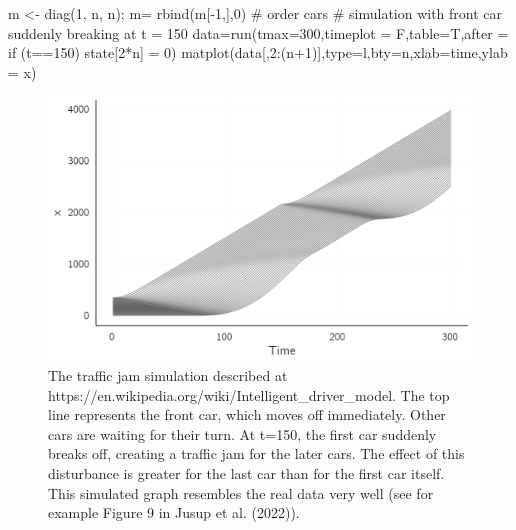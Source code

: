 \documentclass[
  a4paper,
  DIV=11,
  numbers=noendperiod]{scrreprt}
\newenvironment{Shaded}{\begin{snugshade}}{\end{snugshade}}
\newcommand{\AttributeTok}[1]{\textcolor[rgb]{0.40,0.45,0.13}{#1}}
\newcommand{\CommentTok}[1]{\textcolor[rgb]{0.37,0.37,0.37}{#1}}
\newcommand{\DecValTok}[1]{\textcolor[rgb]{0.68,0.00,0.00}{#1}}
\newcommand{\FunctionTok}[1]{\textcolor[rgb]{0.28,0.35,0.67}{#1}}
\newcommand{\NormalTok}[1]{\textcolor[rgb]{0.00,0.23,0.31}{#1}}
\newcommand{\OtherTok}[1]{\textcolor[rgb]{0.00,0.23,0.31}{#1}}
\newcommand{\SpecialCharTok}[1]{\textcolor[rgb]{0.37,0.37,0.37}{#1}}
\newcommand{\StringTok}[1]{\textcolor[rgb]{0.13,0.47,0.30}{#1}}
\begin{document}
\begin{Shaded}
\begin{Highlighting}[]
\NormalTok{m }\OtherTok{\textless{}{-}} \FunctionTok{diag}\NormalTok{(}\DecValTok{1}\NormalTok{, n, n); m}\OtherTok{=} \FunctionTok{rbind}\NormalTok{(m[}\SpecialCharTok{{-}}\DecValTok{1}\NormalTok{,],}\DecValTok{0}\NormalTok{) }\CommentTok{\# order cars}
\CommentTok{\# simulation with front car suddenly breaking at t = 150}
\NormalTok{data}\OtherTok{=}\FunctionTok{run}\NormalTok{(}\AttributeTok{tmax=}\DecValTok{300}\NormalTok{,}\AttributeTok{timeplot =}\NormalTok{ F,}\AttributeTok{table=}\NormalTok{T,}\AttributeTok{after =} \StringTok{\textquotesingle{}if (t==150) state[2*n] = 0\textquotesingle{}}\NormalTok{)}
\FunctionTok{matplot}\NormalTok{(data[,}\DecValTok{2}\SpecialCharTok{:}\NormalTok{(n}\SpecialCharTok{+}\DecValTok{1}\NormalTok{)],}\AttributeTok{type=}\StringTok{\textquotesingle{}l\textquotesingle{}}\NormalTok{,}\AttributeTok{bty=}\StringTok{\textquotesingle{}n\textquotesingle{}}\NormalTok{,}\AttributeTok{xlab=}\StringTok{\textquotesingle{}time\textquotesingle{}}\NormalTok{,}\AttributeTok{ylab =} \StringTok{\textquotesingle{}x\textquotesingle{}}\NormalTok{)}
\end{Highlighting}
\end{Shaded}

\begin{figure}

{\centering \includegraphics{media/ch4n/fig-ch4n-img6-old-54.png}

}

\caption{\label{fig-ch4n-img6-old-54}The traffic jam simulation
described at https://en.wikipedia.org/wiki/Intelligent\_driver\_model.
The top line represents the front car, which moves off immediately.
Other cars are waiting for their turn. At t=150, the first car suddenly
breaks off, creating a traffic jam for the later cars. The effect of
this disturbance is greater for the last car than for the first car
itself. This simulated graph resembles the real data very well (see for
example Figure 9 in Jusup et al. (2022)).}

\end{figure}
\end{document}
